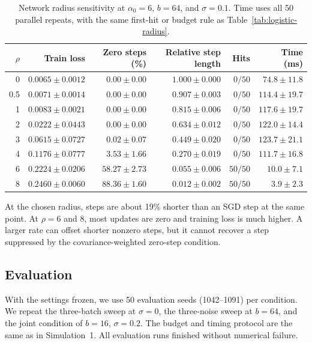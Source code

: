 \documentclass[11pt,a4paper]{article}
\begin{document}
\begin{table}[!htbp]
    \centering
    \small
    \caption{Network radius sensitivity at $\alpha_0=6$, $b=64$, and
    $\sigma=0.1$. Time uses all 50 parallel repeats, with the same
    first-hit or budget rule as Table~\ref{tab:logistic-radius}.}
    \label{tab:network-radius}
    \smallskip
    \begin{tabular}{rrrrrr}
        \hline
        $\rho$ & Train loss & Zero steps (\%) & Relative step length
        & Hits & Time (ms) \\
        \hline
        0   & $0.0065\pm0.0012$ & $0.00\pm0.00$ & $1.000\pm0.000$ & $0/50$ & $74.8\pm11.8$ \\
        0.5 & $0.0071\pm0.0014$ & $0.00\pm0.00$ & $0.907\pm0.003$ & $0/50$ & $114.4\pm19.7$ \\
        1   & $0.0083\pm0.0021$ & $0.00\pm0.00$ & $0.815\pm0.006$ & $0/50$ & $117.6\pm19.7$ \\
        2   & $0.0222\pm0.0443$ & $0.00\pm0.00$ & $0.634\pm0.012$ & $0/50$ & $122.0\pm14.4$ \\
        3   & $0.0615\pm0.0727$ & $0.02\pm0.07$ & $0.449\pm0.020$ & $0/50$ & $123.7\pm21.1$ \\
        4   & $0.1176\pm0.0777$ & $3.53\pm1.66$ & $0.270\pm0.019$ & $0/50$ & $111.7\pm16.8$ \\
        6   & $0.2224\pm0.0206$ & $58.27\pm2.73$ & $0.055\pm0.006$ & $50/50$ & $10.0\pm7.1$ \\
        8   & $0.2460\pm0.0060$ & $88.36\pm1.60$ & $0.012\pm0.002$ & $50/50$ & $3.9\pm2.3$ \\
        \hline
    \end{tabular}
\end{table}

At the chosen radius, steps are about 19\% shorter than an SGD step
at the same point. At $\rho=6$ and $8$, most updates are zero and
training loss is much higher. A larger rate can offset shorter
nonzero steps, but it cannot recover a step suppressed by the
covariance-weighted zero-step condition.

\clearpage
\endgroup

\subsection*{Evaluation}

With the settings frozen, we use 50 evaluation seeds (1042--1091)
per condition. We repeat the three-batch sweep at $\sigma=0$, the
three-noise sweep at $b=64$, and the joint condition of $b=16$,
$\sigma=0.2$. The budget and timing protocol are the same as in
Simulation~1. All evaluation runs finished without numerical failure.
\end{document}
